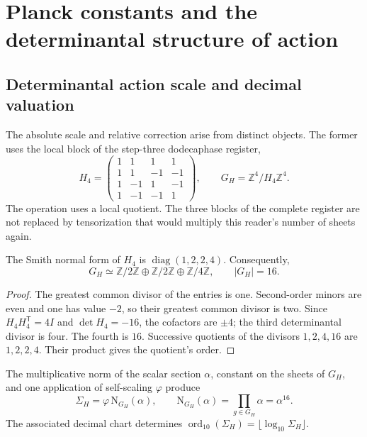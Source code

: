 \section{Planck constants and the determinantal structure of action}
\label{ii:sec:action}
\subsection{Determinantal action scale and decimal valuation}

The absolute scale and relative correction arise from distinct objects. The former uses the local block of the step-three dodecaphase register,
\begin{equation}
 H_4=\begin{pmatrix}
 1&1&1&1\\1&1&-1&-1\\1&-1&1&-1\\1&-1&-1&1
 \end{pmatrix},\qquad
 G_H=\mathbb Z^4/H_4\mathbb Z^4.
 \label{ii:eq:el-h4}
\end{equation}
The operation uses a local quotient. The three blocks of the complete register are not replaced by tensorization that would multiply this reader's number of sheets again.

\begin{lemma}
The Smith normal form of \(H_4\) is
\(\operatorname{diag}(1,2,2,4)\). Consequently,
\[
 G_H\simeq\mathbb Z/2\mathbb Z\oplus\mathbb Z/2\mathbb Z
 \oplus\mathbb Z/4\mathbb Z,\qquad |G_H|=16.
\]
\end{lemma}
\begin{proof}
The greatest common divisor of the entries is one. Second-order minors are even and one has value \(-2\), so their greatest common divisor is two. Since \(H_4H_4^{\mathsf T}=4I\) and \(\det H_4=-16\), the cofactors are \(\pm4\); the third determinantal divisor is four. The fourth is \(16\). Successive quotients of the divisors \(1,2,4,16\) are \(1,2,2,4\). Their product gives the quotient's order.
\end{proof}

\begin{definition}
The multiplicative norm of the scalar section \(\alpha\), constant on the sheets of \(G_H\), and one application of self-scaling \(\varphi\) produce
\begin{equation}
 \Sigma_H=\varphi\,\mathrm N_{G_H}(\alpha),\qquad
 \mathrm N_{G_H}(\alpha)=\prod_{g\in G_H}\alpha=\alpha^{16}.
 \label{ii:eq:el-lector-determinantal}
\end{equation}
The associated decimal chart determines \(\operatorname{ord}_{10}(\Sigma_H)=\lfloor\log_{10}\Sigma_H\rfloor\).
\end{definition}

